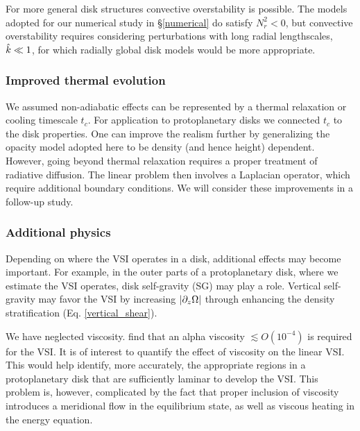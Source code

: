 For more general disk structures convective overstability is
possible. The models adopted for our numerical study in
\S\ref{numerical} do satisfy $N_r^2<0$, but convective overstability
requires considering perturbations with long radial lengthscales,
$\hat{k}\ll 1$, for which radially global disk models would be more 
appropriate.  

\subsubsection{Improved thermal evolution} 
We assumed non-adiabatic effects
can be represented by a thermal relaxation or cooling timescale $t_c$. For 
application to protoplanetary disks we connected $t_c$ to the disk
properties. One can improve the realism further by generalizing the 
opacity model adopted here to be density (and hence height) dependent. 
However, going beyond thermal relaxation requires a
proper treatment of radiative diffusion. The linear problem then
involves a Laplacian operator, which require additional boundary
conditions. We will consider these improvements in a
follow-up study. %
 
\subsubsection{Additional physics} 
Depending on where the VSI operates in a
disk, additional effects may become important. For example, in the
outer parts of a protoplanetary disk, where we estimate the VSI 
operates, disk self-gravity (SG) may play a role. Vertical
self-gravity may favor the VSI by increasing $|\partial_z\Omega|$ through
enhancing the density stratification 
(Eq. \ref{vertical_shear}). %

We have neglected viscosity. \cite{nelson13} find that an 
alpha viscosity $\lesssim O(10^{-4})$ is required for the VSI. 
It is of interest to quantify the effect of viscosity 
on the linear VSI. This would help identify, more accurately, the
appropriate regions in a protoplanetary disk that are sufficiently
laminar to develop the VSI.  This problem is, however, complicated by
the fact that proper inclusion of viscosity introduces a meridional
flow in the equilibrium state, as well as viscous heating
in the energy equation. 


